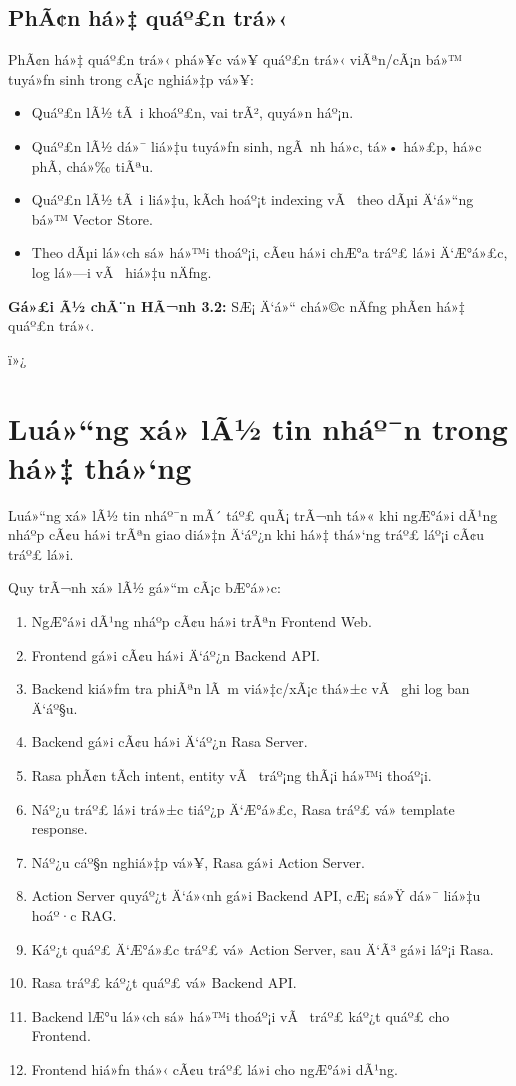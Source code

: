 ﻿\documentclass[12pt,a4paper]{report}
\begin{document}
\subsection{PhÃ¢n há»‡ quáº£n trá»‹}

PhÃ¢n há»‡ quáº£n trá»‹ phá»¥c vá»¥ quáº£n trá»‹ viÃªn/cÃ¡n bá»™ tuyá»ƒn sinh trong cÃ¡c nghiá»‡p vá»¥:
\begin{itemize}
    \item Quáº£n lÃ½ tÃ i khoáº£n, vai trÃ², quyá»n háº¡n.
    \item Quáº£n lÃ½ dá»¯ liá»‡u tuyá»ƒn sinh, ngÃ nh há»c, tá»• há»£p, há»c phÃ­, chá»‰ tiÃªu.
    \item Quáº£n lÃ½ tÃ i liá»‡u, kÃ­ch hoáº¡t indexing vÃ  theo dÃµi Ä‘á»“ng bá»™ Vector Store.
    \item Theo dÃµi lá»‹ch sá»­ há»™i thoáº¡i, cÃ¢u há»i chÆ°a tráº£ lá»i Ä‘Æ°á»£c, log lá»—i vÃ  hiá»‡u nÄƒng.
\end{itemize}

\textbf{Gá»£i Ã½ chÃ¨n HÃ¬nh 3.2:} SÆ¡ Ä‘á»“ chá»©c nÄƒng phÃ¢n há»‡ quáº£n trá»‹.



ï»¿\section{Luá»“ng xá»­ lÃ½ tin nháº¯n trong há»‡ thá»‘ng}

Luá»“ng xá»­ lÃ½ tin nháº¯n mÃ´ táº£ quÃ¡ trÃ¬nh tá»« khi ngÆ°á»i dÃ¹ng nháº­p cÃ¢u há»i trÃªn giao diá»‡n Ä‘áº¿n khi há»‡ thá»‘ng tráº£ láº¡i cÃ¢u tráº£ lá»i.

Quy trÃ¬nh xá»­ lÃ½ gá»“m cÃ¡c bÆ°á»›c:
\begin{enumerate}
    \item NgÆ°á»i dÃ¹ng nháº­p cÃ¢u há»i trÃªn Frontend Web.
    \item Frontend gá»­i cÃ¢u há»i Ä‘áº¿n Backend API.
    \item Backend kiá»ƒm tra phiÃªn lÃ m viá»‡c/xÃ¡c thá»±c vÃ  ghi log ban Ä‘áº§u.
    \item Backend gá»­i cÃ¢u há»i Ä‘áº¿n Rasa Server.
    \item Rasa phÃ¢n tÃ­ch intent, entity vÃ  tráº¡ng thÃ¡i há»™i thoáº¡i.
    \item Náº¿u tráº£ lá»i trá»±c tiáº¿p Ä‘Æ°á»£c, Rasa tráº£ vá» template response.
    \item Náº¿u cáº§n nghiá»‡p vá»¥, Rasa gá»i Action Server.
    \item Action Server quyáº¿t Ä‘á»‹nh gá»i Backend API, cÆ¡ sá»Ÿ dá»¯ liá»‡u hoáº·c RAG.
    \item Káº¿t quáº£ Ä‘Æ°á»£c tráº£ vá» Action Server, sau Ä‘Ã³ gá»­i láº¡i Rasa.
    \item Rasa tráº£ káº¿t quáº£ vá» Backend API.
    \item Backend lÆ°u lá»‹ch sá»­ há»™i thoáº¡i vÃ  tráº£ káº¿t quáº£ cho Frontend.
    \item Frontend hiá»ƒn thá»‹ cÃ¢u tráº£ lá»i cho ngÆ°á»i dÃ¹ng.
\end{enumerate}
\end{document}
